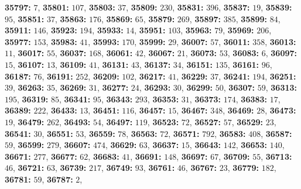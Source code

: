 \textsf{\bfseries 35797:} $7$, \textsf{\bfseries 35801:} $107$, \textsf{\bfseries 35803:} $37$, \textsf{\bfseries 35809:} $230$, \textsf{\bfseries 35831:} $396$, \textsf{\bfseries 35837:} $19$, \textsf{\bfseries 35839:} $95$, \textsf{\bfseries 35851:} $37$, \textsf{\bfseries 35863:} $176$, \textsf{\bfseries 35869:} $65$, \textsf{\bfseries 35879:} $269$, \textsf{\bfseries 35897:} $385$, \textsf{\bfseries 35899:} $84$, \textsf{\bfseries 35911:} $146$, \textsf{\bfseries 35923:} $194$, \textsf{\bfseries 35933:} $14$, \textsf{\bfseries 35951:} $103$, \textsf{\bfseries 35963:} $79$, \textsf{\bfseries 35969:} $206$, \textsf{\bfseries 35977:} $153$, \textsf{\bfseries 35983:} $41$, \textsf{\bfseries 35993:} $170$, \textsf{\bfseries 35999:} $29$, \textsf{\bfseries 36007:} $57$, \textsf{\bfseries 36011:} $358$, \textsf{\bfseries 36013:} $11$, \textsf{\bfseries 36017:} $55$, \textsf{\bfseries 36037:} $168$, \textsf{\bfseries 36061:} $42$, \textsf{\bfseries 36067:} $21$, \textsf{\bfseries 36073:} $53$, \textsf{\bfseries 36083:} $6$, \textsf{\bfseries 36097:} $15$, \textsf{\bfseries 36107:} $13$, \textsf{\bfseries 36109:} $41$, \textsf{\bfseries 36131:} $43$, \textsf{\bfseries 36137:} $34$, \textsf{\bfseries 36151:} $135$, \textsf{\bfseries 36161:} $96$, \textsf{\bfseries 36187:} $76$, \textsf{\bfseries 36191:} $252$, \textsf{\bfseries 36209:} $102$, \textsf{\bfseries 36217:} $41$, \textsf{\bfseries 36229:} $37$, \textsf{\bfseries 36241:} $194$, \textsf{\bfseries 36251:} $39$, \textsf{\bfseries 36263:} $35$, \textsf{\bfseries 36269:} $31$, \textsf{\bfseries 36277:} $24$, \textsf{\bfseries 36293:} $30$, \textsf{\bfseries 36299:} $50$, \textsf{\bfseries 36307:} $59$, \textsf{\bfseries 36313:} $195$, \textsf{\bfseries 36319:} $85$, \textsf{\bfseries 36341:} $95$, \textsf{\bfseries 36343:} $293$, \textsf{\bfseries 36353:} $31$, \textsf{\bfseries 36373:} $174$, \textsf{\bfseries 36383:} $17$, \textsf{\bfseries 36389:} $222$, \textsf{\bfseries 36433:} $13$, \textsf{\bfseries 36451:} $116$, \textsf{\bfseries 36457:} $15$, \textsf{\bfseries 36467:} $348$, \textsf{\bfseries 36469:} $28$, \textsf{\bfseries 36473:} $19$, \textsf{\bfseries 36479:} $262$, \textsf{\bfseries 36493:} $54$, \textsf{\bfseries 36497:} $119$, \textsf{\bfseries 36523:} $72$, \textsf{\bfseries 36527:} $57$, \textsf{\bfseries 36529:} $23$, \textsf{\bfseries 36541:} $30$, \textsf{\bfseries 36551:} $53$, \textsf{\bfseries 36559:} $78$, \textsf{\bfseries 36563:} $72$, \textsf{\bfseries 36571:} $792$, \textsf{\bfseries 36583:} $408$, \textsf{\bfseries 36587:} $59$, \textsf{\bfseries 36599:} $279$, \textsf{\bfseries 36607:} $474$, \textsf{\bfseries 36629:} $63$, \textsf{\bfseries 36637:} $15$, \textsf{\bfseries 36643:} $142$, \textsf{\bfseries 36653:} $140$, \textsf{\bfseries 36671:} $277$, \textsf{\bfseries 36677:} $62$, \textsf{\bfseries 36683:} $41$, \textsf{\bfseries 36691:} $148$, \textsf{\bfseries 36697:} $67$, \textsf{\bfseries 36709:} $55$, \textsf{\bfseries 36713:} $46$, \textsf{\bfseries 36721:} $63$, \textsf{\bfseries 36739:} $217$, \textsf{\bfseries 36749:} $93$, \textsf{\bfseries 36761:} $46$, \textsf{\bfseries 36767:} $23$, \textsf{\bfseries 36779:} $182$, \textsf{\bfseries 36781:} $59$, \textsf{\bfseries 36787:} $2$, 
